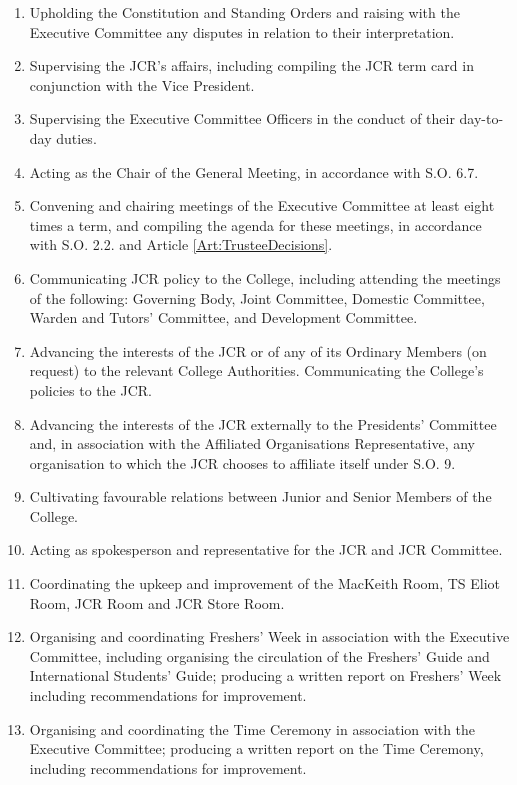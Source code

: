 \begin{enumerate}
	\item Upholding the Constitution and Standing Orders and raising with the Executive Committee any disputes in relation to their interpretation.
	\item Supervising the JCR's affairs, including compiling the JCR term card in conjunction with the Vice President.     
	\item Supervising the Executive Committee Officers in the conduct of their day-to-day duties.
	\item Acting as the Chair of the General Meeting, in accordance with S.O. 6.7.     
	\item Convening and chairing meetings of the Executive Committee at least eight times a term, and compiling the agenda for these meetings, in accordance with S.O. 2.2. and Article \ref{Art:TrusteeDecisions}.
	\item Communicating JCR policy to the College, including attending the meetings of the following: Governing Body, Joint Committee, Domestic Committee, Warden and Tutors' Committee, and Development Committee.
	\item Advancing the interests of the JCR or of any of its Ordinary Members (on request) to the relevant College Authorities.
	Communicating the College's policies to the JCR.     
	\item Advancing the interests of the JCR externally to the Presidents' Committee and, in association with the Affiliated Organisations Representative, any organisation to which the JCR chooses to affiliate itself under S.O. 9.
	\item Cultivating favourable relations between Junior and Senior Members of the College.
	\item Acting as spokesperson and representative for the JCR and JCR Committee.
	\item Coordinating the upkeep and improvement of the MacKeith Room, TS Eliot Room, JCR Room and JCR Store Room.
	\item Organising and coordinating Freshers' Week in association with the Executive Committee, including organising the circulation of the Freshers' Guide and International Students' Guide; producing a written report on Freshers' Week including recommendations for improvement.
	\item Organising and coordinating the Time Ceremony in association with the Executive Committee; producing a written report on the Time Ceremony, including recommendations for improvement.

\end{enumerate}
